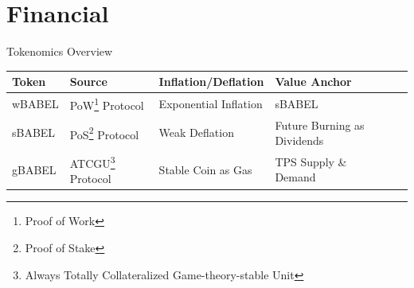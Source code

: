 \documentclass{beamer}
\begin{document}
\section{Financial}

\begin{frame}{Tokenomics Overview}
\begin{table}
\begin{footnotesize}
\begin{tabular}{l l l ll}
\hline

\textbf{Token} & \textbf{Source} & \textbf{Inflation/Deflation} & \textbf{Value Anchor} \\
\hline
wBABEL & PoW\footnote{{\tiny Proof of Work}} Protocol & Exponential Inflation & sBABEL  \\
sBABEL & PoS\footnote{{\tiny Proof of Stake}} Protocol & Weak Deflation & Future Burning as Dividends \\
gBABEL & ATCGU\footnote{{\tiny Always Totally Collateralized Game-theory-stable Unit}} Protocol & Stable Coin as Gas & TPS Supply \& Demand \\
\hline
\end{tabular}
\end{footnotesize}
\end{table}



\end{frame}
\end{document}
